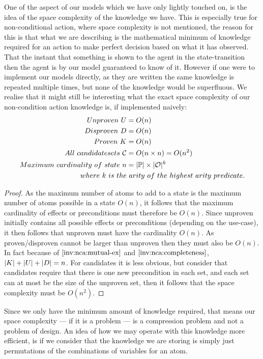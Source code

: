 \documentclass[../Master.tex]{subfiles}
\begin{document}
One of the aspect of our models which we have only lightly touched on, is the idea of the space complexity of the knowledge we have.
This is especially true for non-conditional action, where space complexity is not mentioned, 
the reason for this is that what we are describing is the mathematical minimum of knowledge required for an action to make perfect decision based on what it has observed.
That the instant that something is shown to the agent in the state-transition then the agent is by our model guaranteed to know of it.
However if one were to implement our models directly, as they are written the same knowledge is repeated multiple times, but none of the knowledge would be superfluous.
We realise that it might still be interesting what the exact space complexity of our non-condition action knowledge is, if implemented naively:
 \begin{align*}
 	Unproven ~U & = O(n) \\
 	Disproven~D & = O(n) \\
 	Proven~K &= O(n) \\
 	All ~ candidate sets~ \mathcal{C} & = O(n \times n)=O(n^2) \\
 	Maximum ~ cardinality~ of ~ state  ~ n & = |\mathbb{P}| \times |\mathcal{O}|^k \\
 	where ~ k ~ is ~ the&  ~ arity ~ of ~ the~ highest~ arity ~ predicate.
 \end{align*} 
 \begin{proof} 
 	As the maximum number of atoms to add to a state is the maximum number of atoms possible in a state $O(n)$,
 	it follows that the maximum cardinality of effects or preconditions must therefore be $O(n)$.
	Since unproven initially contains all possible effects or preconditions (depending on the use-case), 
	it then follows that unproven must have the cardinality $O(n)$. 
	As proven/disproven cannot be larger than unproven then they must also be $O(n)$.
	In fact because of $\Cref{inv:nca:mutual-ex}$ and $\Cref{inv:nca:completeness}$, $|K|+|U|+|D| = n$.
	For candidates it is less obvious, but consider that candidates require that there is one new precondition in
	each set, and each set can at most be the size of the unproven set, then it follows that the space complexity must be $O(n^2)$.
 \end{proof}
Since we only have the minimum amount of knowledge required, that means our space complexity --- if it is a problem --- is a compression problem and not a problem of design. 
An idea of how we may operate with this knowledge more efficient, is if we consider that the knowledge we are storing is simply just permutations of the combinations of variables for an atom.
\end{document}
